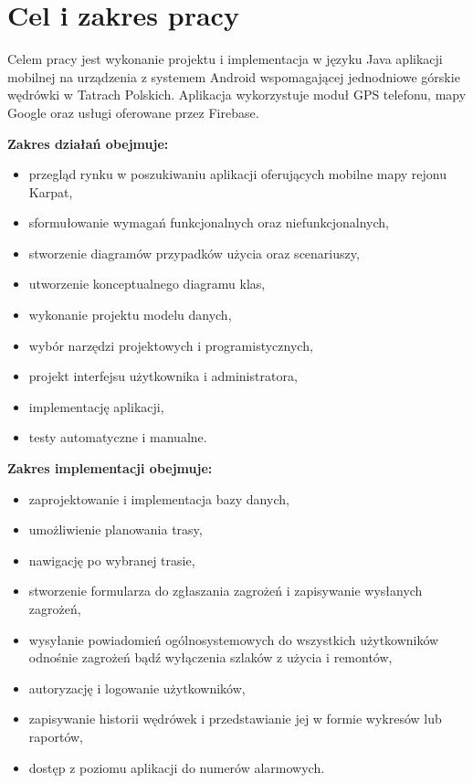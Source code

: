 \section{Cel i zakres pracy}

    Celem pracy jest wykonanie projektu i implementacja w języku Java aplikacji mobilnej na urządzenia z systemem Android wspomagającej jednodniowe górskie wędrówki w Tatrach Polskich. Aplikacja wykorzystuje moduł GPS telefonu, mapy Google oraz usługi oferowane przez Firebase.


    \vspace{0.5cm}
    \noindent
    \textbf{Zakres działań obejmuje:}
    \begin{itemize}
        \item przegląd rynku w poszukiwaniu aplikacji oferujących mobilne mapy rejonu Karpat,
        \item sformułowanie wymagań funkcjonalnych oraz niefunkcjonalnych, 
        \item stworzenie diagramów przypadków użycia oraz scenariuszy,  
        \item utworzenie konceptualnego diagramu klas, 
        \item wykonanie projektu modelu danych,
        \item wybór narzędzi projektowych i programistycznych, 
        \item projekt interfejsu użytkownika i administratora,
        \item implementację aplikacji,
        \item testy automatyczne i manualne.
    \end{itemize}
    \textbf{Zakres implementacji obejmuje:}
    \begin{itemize}
        \item zaprojektowanie i implementacja bazy danych,
        \item umożliwienie planowania trasy,
        \item nawigację po wybranej trasie,
        \item stworzenie formularza do zgłaszania zagrożeń i zapisywanie wysłanych zagrożeń,
        \item wysyłanie powiadomień ogólnosystemowych do wszystkich użytkowników odnośnie zagrożeń bądź wyłączenia szlaków z użycia i remontów,
        \item autoryzację i logowanie użytkowników,
        \item zapisywanie historii wędrówek i przedstawianie jej w formie wykresów lub raportów,
        \item dostęp z poziomu aplikacji do numerów alarmowych.
    \end{itemize}
